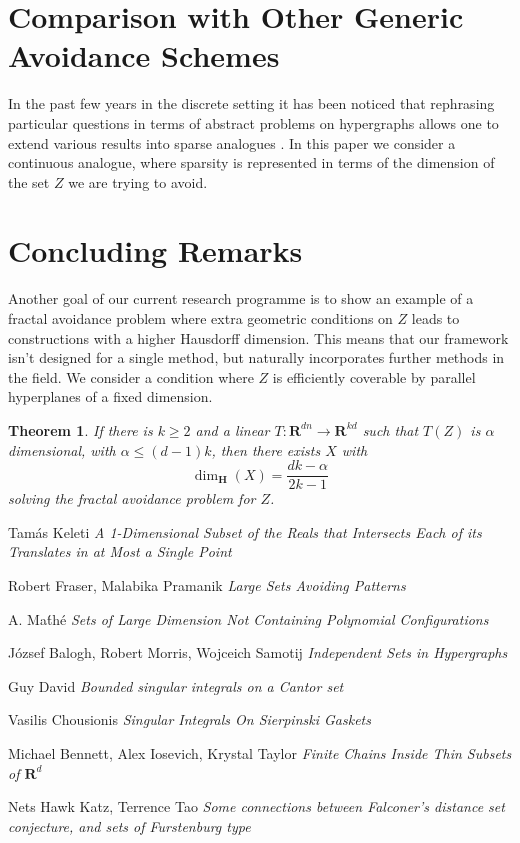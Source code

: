 \documentclass{article}
\theoremstyle{plain}
\theoremstyle{plain}
\newtheorem{theorem}{Theorem}
\begin{document}
\begin{multicols}{2}
\section{Comparison with Other Generic Avoidance Schemes}

In the past few years in the discrete setting it has been noticed that rephrasing particular questions in terms of abstract problems on hypergraphs allows one to extend various results into sparse analogues \cite{BaloghMorrisSamotij}. In this paper we consider a continuous analogue, where sparsity is represented in terms of the dimension of the set $Z$ we are trying to avoid.

\section{Concluding Remarks}



Another goal of our current research programme is to show an example of a fractal avoidance problem where extra geometric conditions on $Z$ leads to constructions with a higher Hausdorff dimension. This means that our framework isn't designed for a single method, but naturally incorporates further methods in the field. We consider a condition where $Z$ is efficiently coverable by parallel hyperplanes of a fixed dimension.

\begin{theorem}
	If there is $k \geq 2$ and a linear $T: \mathbf{R}^{dn} \to \mathbf{R}^{kd}$ such that $T(Z)$ is $\alpha$ dimensional, with $\alpha \leq (d-1)k$, then there exists $X$ with
	\[ \dim_{\mathbf{H}}(X) = \frac{dk - \alpha}{2k-1} \]
	solving the fractal avoidance problem for $Z$.
\end{theorem}

\begin{thebibliography}{9}

Tam\'{a}s Keleti
\textit{A 1-Dimensional Subset of the Reals that Intersects Each of its Translates in at Most a Single Point}

Robert Fraser, Malabika Pramanik
\textit{Large Sets Avoiding Patterns}

A. Ma\'{t}h\'{e}
\textit{Sets of Large Dimension Not Containing Polynomial Configurations}

J\'{o}zsef Balogh, Robert Morris, Wojceich Samotij
\textit{Independent Sets in Hypergraphs}

Guy David
\textit{Bounded singular integrals on a Cantor set}

Vasilis Chousionis
\textit{Singular Integrals On Sierpinski Gaskets}

Michael Bennett, Alex Iosevich, Krystal Taylor
\textit{Finite Chains Inside Thin Subsets of $\mathbf{R}^d$}

Nets Hawk Katz, Terrence Tao
\textit{Some connections between Falconer's distance set conjecture, and sets of Furstenburg type}

\end{thebibliography}

\end{multicols}
\end{document}
